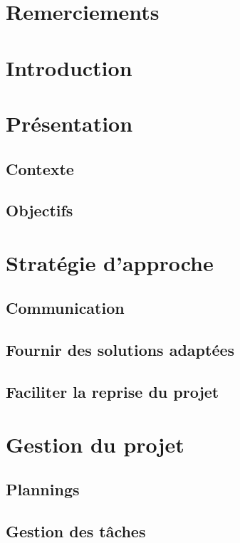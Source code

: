\documentclass[UTF8]{EPURapport}
\begin{document}
\chapter{Remerciements}

\chapter{Introduction}

\chapter{Présentation}

\section{Contexte}

\section{Objectifs}

\chapter{Stratégie d'approche}

\section{Communication}

\section{Fournir des solutions adaptées}

\section{Faciliter la reprise du projet}

\chapter{Gestion du projet}

\section{Plannings}

\section{Gestion des tâches}
\end{document}
